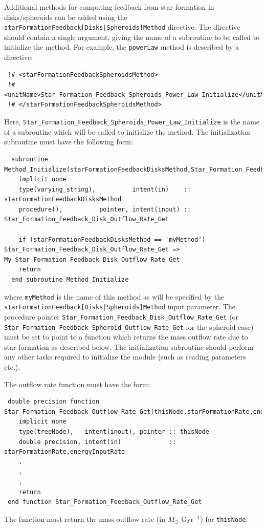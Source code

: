 Additional methods for computing feedback from star formation in disks/spheroids can be added using the {\tt starFormationFeedback[Disks|Spheroids]Method} directive. The directive should contain a single argument, giving the name of a subroutine to be called to initialize the method. For example, the {\tt powerLaw} method is described by a directive:
\begin{verbatim}
 !# <starFormationFeedbackSpheroidsMethod>
 !#  <unitName>Star_Formation_Feedback_Spheroids_Power_Law_Initialize</unitName>
 !# </starFormationFeedbackSpheroidsMethod>
\end{verbatim}
Here, {\tt Star\_Formation\_Feedback\_Spheroids\_Power\_Law\_Initialize} is the name of a subroutine which will be called to initialize the method. The initialization subroutine must have the following form:
\begin{verbatim}
  subroutine Method_Initialize(starFormationFeedbackDisksMethod,Star_Formation_Feedback_Disk_Outflow_Rate_Get)
    implicit none
    type(varying_string),          intent(in)    :: starFormationFeedbackDisksMethod
    procedure(),          pointer, intent(inout) :: Star_Formation_Feedback_Disk_Outflow_Rate_Get
    
    if (starFormationFeedbackDisksMethod == 'myMethod') Star_Formation_Feedback_Disk_Outflow_Rate_Get => My_Star_Formation_Feedback_Disk_Outflow_Rate_Get
    return
  end subroutine Method_Initialize
\end{verbatim}
where {\tt myMethod} is the name of this method as will be specified by the {\tt starFormationFeedback[Disks|Spheroids]Method} input parameter. The procedure pointer {\tt Star\_Formation\_Feedback\_Disk\_Outflow\_Rate\_Get} (or {\tt Star\_Formation\_Feedback\_Spheroid\_Outflow\_Rate\_Get} for the spheroid case) must be set to point to a function which returns the mass outflow rate due to star formation as described below. The initialization subroutine should perform any other tasks required to initialize the module (such as reading parameters etc.).

The outflow rate function must have the form:
\begin{verbatim}
 double precision function Star_Formation_Feedback_Outflow_Rate_Get(thisNode,starFormationRate,energyInputRate)
    implicit none
    type(treeNode),   intent(inout), pointer :: thisNode
    double precision, intent(in)             :: starFormationRate,energyInputRate
    .
    .
    .
    return
 end function Star_Formation_Feedback_Outflow_Rate_Get
\end{verbatim}
The function must return the mass outflow rate (in $M_\odot$ Gyr$^{-1}$) for {\tt thisNode}.

